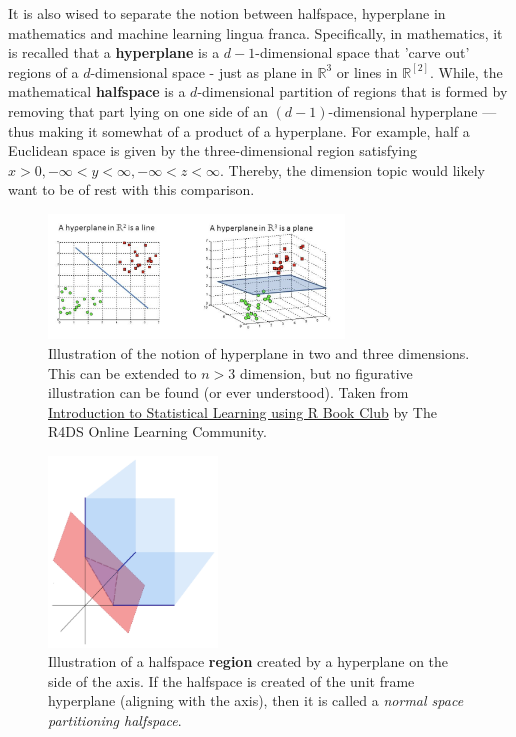 It is also wised to separate the notion between halfspace, hyperplane in mathematics and machine learning lingua franca. Specifically, in mathematics, it is recalled that a \textbf{hyperplane} is a $d-1$-dimensional space that 'carve out' regions of a $d$-dimensional space - just as plane in $\mathbb{R}^{3}$ or lines in $\mathbb{R}^[2]$. While, the mathematical \textbf{halfspace} is a $d$-dimensional partition of regions that is formed by removing that part lying on one side of an $(d-1)$-dimensional hyperplane --- thus making it somewhat of a product of a hyperplane. For example, half a Euclidean space is given by the three-dimensional region satisfying $x>0,-\infty< y< \infty, -\infty < z < \infty$. Thereby, the dimension topic would likely want to be of rest with this comparison. 
\begin{figure}[htb]
    \centering
    \includegraphics[width=0.7\textwidth]{img/hyperplane.png}
    \caption{Illustration of the notion of hyperplane in two and three dimensions. This can be extended to $n>3$ dimension, but no figurative illustration can be found (or ever understood). Taken from \href{https://r4ds.github.io/bookclub-islr/hyperplane.html}{Introduction to Statistical Learning using R Book Club} by The R4DS Online Learning Community.}
\end{figure}
\begin{figure}[htb]
    \centering
    \includegraphics[width=0.4\textwidth]{img/halfspace_illustration_c4.png}
    \caption{Illustration of a halfspace \textbf{region} created by a hyperplane on the side of the axis. If the halfspace is created of the unit frame hyperplane (aligning with the axis), then it is called a \textit{normal space partitioning halfspace}.}
\end{figure}
